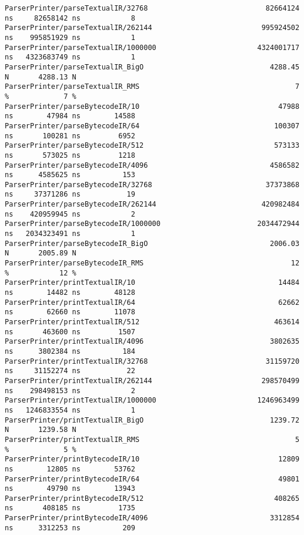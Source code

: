 \begin{code}
\begin{verbatim}
ParserPrinter/parseTextualIR/32768                            82664124 ns     82658142 ns            8
ParserPrinter/parseTextualIR/262144                          995924502 ns    995851929 ns            1
ParserPrinter/parseTextualIR/1000000                        4324001717 ns   4323683749 ns            1
ParserPrinter/parseTextualIR_BigO                              4288.45 N       4288.13 N
ParserPrinter/parseTextualIR_RMS                                     7 %             7 %
ParserPrinter/parseBytecodeIR/10                                 47988 ns        47984 ns        14588
ParserPrinter/parseBytecodeIR/64                                100307 ns       100281 ns         6952
ParserPrinter/parseBytecodeIR/512                               573133 ns       573025 ns         1218
ParserPrinter/parseBytecodeIR/4096                             4586582 ns      4585625 ns          153
ParserPrinter/parseBytecodeIR/32768                           37373868 ns     37371286 ns           19
ParserPrinter/parseBytecodeIR/262144                         420982484 ns    420959945 ns            2
ParserPrinter/parseBytecodeIR/1000000                       2034472944 ns   2034323491 ns            1
ParserPrinter/parseBytecodeIR_BigO                             2006.03 N       2005.89 N
ParserPrinter/parseBytecodeIR_RMS                                   12 %            12 %
ParserPrinter/printTextualIR/10                                  14484 ns        14482 ns        48128
ParserPrinter/printTextualIR/64                                  62662 ns        62660 ns        11078
ParserPrinter/printTextualIR/512                                463614 ns       463600 ns         1507
ParserPrinter/printTextualIR/4096                              3802635 ns      3802384 ns          184
ParserPrinter/printTextualIR/32768                            31159720 ns     31152274 ns           22
ParserPrinter/printTextualIR/262144                          298570499 ns    298498153 ns            2
ParserPrinter/printTextualIR/1000000                        1246963499 ns   1246833554 ns            1
ParserPrinter/printTextualIR_BigO                              1239.72 N       1239.58 N
ParserPrinter/printTextualIR_RMS                                     5 %             5 %
ParserPrinter/printBytecodeIR/10                                 12809 ns        12805 ns        53762
ParserPrinter/printBytecodeIR/64                                 49801 ns        49790 ns        13943
ParserPrinter/printBytecodeIR/512                               408265 ns       408185 ns         1735
ParserPrinter/printBytecodeIR/4096                             3312854 ns      3312253 ns          209

\end{verbatim}
\end{code}
